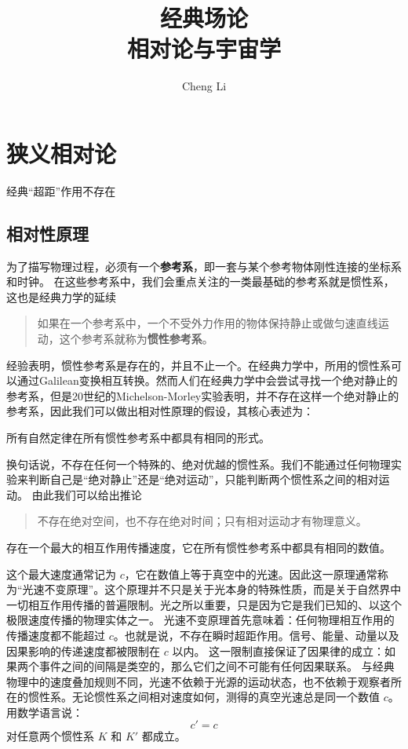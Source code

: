 \documentclass[a4paper]{report}
\author{Cheng Li}
\title{\textbf{{\Huge 经典场论}}\\{\normalsize 相对论与宇宙学}}
\begin{document}
\maketitle
\tableofcontents


\chapter{狭义相对论}
经典“超距”作用不存在
\section{相对性原理}


为了描写物理过程，必须有一个\textbf{参考系}，即一套与某个参考物体刚性连接的坐标系和时钟。
在这些参考系中，我们会重点关注的一类最基础的参考系就是惯性系，这也是经典力学的延续
\begin{quote}
如果在一个参考系中，一个不受外力作用的物体保持静止或做匀速直线运动，这个参考系就称为\textbf{惯性参考系}。
\end{quote}
经验表明，惯性参考系是存在的，并且不止一个。在经典力学中，所用的惯性系可以通过Galilean变换相互转换。然而人们在经典力学中会尝试寻找一个绝对静止的参考系，但是20世纪的Michelson-Morley实验表明，并不存在这样一个绝对静止的参考系，因此我们可以做出相对性原理的假设，其核心表述为：
\begin{theorem}[相对性原理]
所有自然定律在所有惯性参考系中都具有相同的形式。
\end{theorem}
换句话说，不存在任何一个特殊的、绝对优越的惯性系。我们不能通过任何物理实验来判断自己是“绝对静止”还是“绝对运动”，只能判断两个惯性系之间的相对运动。
由此我们可以给出推论
\begin{quote}
不存在绝对空间，也不存在绝对时间；只有相对运动才有物理意义。
\end{quote}

\begin{theorem}[光速不变原理]
    存在一个最大的相互作用传播速度，它在所有惯性参考系中都具有相同的数值。
\end{theorem}


这个最大速度通常记为 \(c\)，它在数值上等于真空中的光速。因此这一原理通常称为“光速不变原理”。这个原理并不只是关于光本身的特殊性质，而是关于自然界中一切相互作用传播的普遍限制。光之所以重要，只是因为它是我们已知的、以这个极限速度传播的物理实体之一。
光速不变原理首先意味着：任何物理相互作用的传播速度都不能超过 \(c\)。也就是说，不存在瞬时超距作用。信号、能量、动量以及因果影响的传递速度都被限制在 \(c\) 以内。
这一限制直接保证了因果律的成立：如果两个事件之间的间隔是类空的，那么它们之间不可能有任何因果联系。
与经典物理中的速度叠加规则不同，光速不依赖于光源的运动状态，也不依赖于观察者所在的惯性系。无论惯性系之间相对速度如何，测得的真空光速总是同一个数值 \(c\)。
用数学语言说：
\[
c' = c
\]
对任意两个惯性系 \(K\) 和 \(K'\) 都成立。
\end{document}
